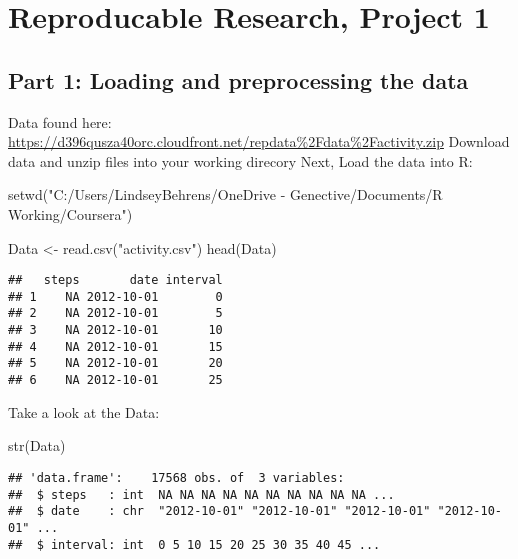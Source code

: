 \documentclass[
]{article}
\author{}
\date{\vspace{-2.5em}}
\newenvironment{Shaded}{\begin{snugshade}}{\end{snugshade}}
\newcommand{\FunctionTok}[1]{\textcolor[rgb]{0.00,0.00,0.00}{#1}}
\newcommand{\NormalTok}[1]{#1}
\newcommand{\OtherTok}[1]{\textcolor[rgb]{0.56,0.35,0.01}{#1}}
\newcommand{\StringTok}[1]{\textcolor[rgb]{0.31,0.60,0.02}{#1}}
\begin{document}
\hypertarget{reproducable-research-project-1}{%
\section{Reproducable Research, Project
1}\label{reproducable-research-project-1}}

\hypertarget{part-1-loading-and-preprocessing-the-data}{%
\subsection{Part 1: Loading and preprocessing the
data}\label{part-1-loading-and-preprocessing-the-data}}

Data found here:
\url{https://d396qusza40orc.cloudfront.net/repdata\%2Fdata\%2Factivity.zip}
Download data and unzip files into your working direcory Next, Load the
data into R:

\begin{Shaded}
\begin{Highlighting}[]
\FunctionTok{setwd}\NormalTok{(}\StringTok{"C:/Users/LindseyBehrens/OneDrive {-} Genective/Documents/R Working/Coursera"}\NormalTok{)}

\NormalTok{Data }\OtherTok{\textless{}{-}} \FunctionTok{read.csv}\NormalTok{(}\StringTok{"activity.csv"}\NormalTok{)}
\FunctionTok{head}\NormalTok{(Data)}
\end{Highlighting}
\end{Shaded}

\begin{verbatim}
##   steps       date interval
## 1    NA 2012-10-01        0
## 2    NA 2012-10-01        5
## 3    NA 2012-10-01       10
## 4    NA 2012-10-01       15
## 5    NA 2012-10-01       20
## 6    NA 2012-10-01       25
\end{verbatim}

Take a look at the Data:

\begin{Shaded}
\begin{Highlighting}[]
\FunctionTok{str}\NormalTok{(Data)}
\end{Highlighting}
\end{Shaded}

\begin{verbatim}
## 'data.frame':    17568 obs. of  3 variables:
##  $ steps   : int  NA NA NA NA NA NA NA NA NA NA ...
##  $ date    : chr  "2012-10-01" "2012-10-01" "2012-10-01" "2012-10-01" ...
##  $ interval: int  0 5 10 15 20 25 30 35 40 45 ...
\end{verbatim}
\end{document}
